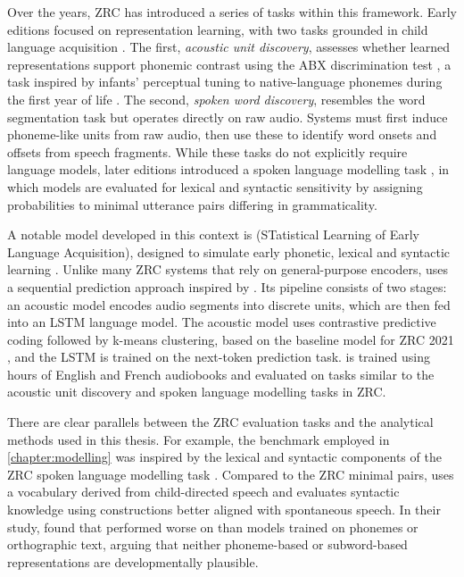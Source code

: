 Over the years, ZRC has introduced a series of tasks within this framework. Early editions focused on representation learning, with two tasks grounded in child language acquisition \citep{versteegh2015zero, dunbar2017zero}. The first, \emph{acoustic unit discovery}, assesses whether learned representations support phonemic contrast using the ABX discrimination test \citep{schatz2016abx}, a task inspired by infants' perceptual tuning to native-language phonemes during the first year of life \citep{werker1984cross, kuhl1991human}. The second, \emph{spoken word discovery}, resembles the word segmentation task but operates directly on raw audio. Systems must first induce phoneme-like units from raw audio, then use these to identify word onsets and offsets from speech fragments. While these tasks do not explicitly require language models, later editions introduced a spoken language modelling task \citep{dunbar2021zero}, in which models are evaluated for lexical and syntactic sensitivity by assigning probabilities to minimal utterance pairs differing in grammaticality.

A notable model developed in this context is \stela (STatistical Learning of Early Language Acquisition), designed to simulate early phonetic, lexical and syntactic learning \citep{lavechin2022can, lavechin2025simulating}. Unlike many ZRC systems that rely on general-purpose encoders, \stela uses a sequential prediction approach inspired by \citet{elman1990finding}. Its pipeline consists of two stages: an acoustic model encodes  audio segments into discrete units, which are then fed into an LSTM language model. The acoustic model uses contrastive predictive coding followed by k-means clustering, based on the baseline model for ZRC 2021 \citep{nguyen2020zero}, and the LSTM is trained on the next-token prediction task. \stela is trained using  hours of English and French audiobooks and evaluated on tasks similar to the acoustic unit discovery and spoken language modelling tasks in ZRC.

There are clear parallels between the ZRC evaluation tasks and the analytical methods used in this thesis. For example, the \babyslm benchmark employed in \cref{chapter:modelling} was inspired by the lexical and syntactic components of the ZRC spoken language modelling task \citep{lavechin}. Compared to the ZRC minimal pairs, \babyslm uses a vocabulary derived from child-directed speech and evaluates syntactic knowledge using constructions better aligned with spontaneous speech. In their study, \citet{lavechin} found that \stela performed worse on \babyslm than models trained on phonemes or orthographic text, arguing that neither phoneme-based or subword-based representations are developmentally plausible.

